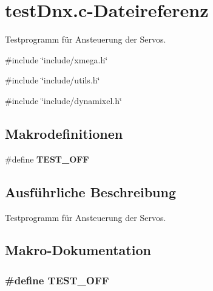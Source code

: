 \section{testDnx.c-\/Dateireferenz}
\label{test_dnx_8c}


Testprogramm für Ansteuerung der Servos.  


{\ttfamily \#include \char`\"{}include/xmega.h\char`\"{}}\par
{\ttfamily \#include \char`\"{}include/utils.h\char`\"{}}\par
{\ttfamily \#include \char`\"{}include/dynamixel.h\char`\"{}}\par
\subsection*{Makrodefinitionen}
\begin{DoxyCompactItemize}
\item 
\#define {\bf TEST\_\-OFF}
\end{DoxyCompactItemize}


\subsection{Ausführliche Beschreibung}
Testprogramm für Ansteuerung der Servos. 

\subsection{Makro-\/Dokumentation}
\subsubsection[{TEST\_\-OFF}]{\setlength{\rightskip}{0pt plus 5cm}\#define TEST\_\-OFF}\label{test_dnx_8c_a8f6764e8e57eabbb14922404c0e25175}
